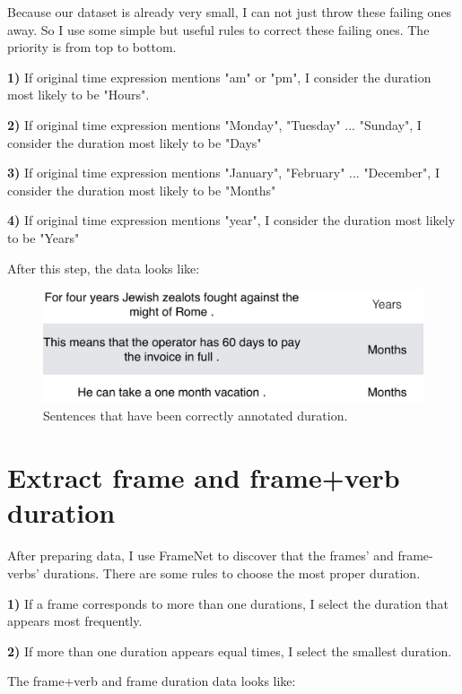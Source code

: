 \documentclass[11pt,a4paper]{article}
\begin{document}
Because our dataset is already very small, I can not just throw these failing ones away. So I use some simple but useful rules to correct these failing ones. The priority is from top to bottom.

\textbf{1)} If original time expression mentions "am" or "pm", I consider the duration most likely to be "Hours".

\textbf{2)} If original time expression mentions "Monday", "Tuesday" ... "Sunday", I consider the duration most likely to be "Days"

\textbf{3)} If original time expression mentions "January", "February" ... "December", I consider the duration most likely to be "Months"

\textbf{4)} If original time expression mentions "year", I consider the duration most likely to be "Years"

After this step, the data looks like:

\begin{figure}[H] 
\begin{center} 
\centerline{\includegraphics[width=\columnwidth]{figs/fig2.png}}
\caption{Sentences that have been correctly annotated duration.}
\label{second_fig}
\end{center}
\vskip -0.3in
\end{figure}


\section{Extract frame and frame+verb duration}

After preparing data, I use FrameNet to discover that the frames' and frame-verbs' durations. There are some rules to choose the most proper duration.

\textbf{1)} If a frame corresponds to more than one durations, I select the duration that appears most frequently.

\textbf{2)} If more than one duration appears equal times, I select the smallest duration.

The frame+verb and frame duration data looks like:
\end{document}
